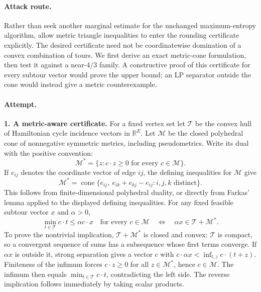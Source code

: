 \documentclass[11pt,a4paper]{article}
\newcommand{\R}{\mathbb{R}}
\numberwithin{equation}{section}
\begin{document}
\paragraph{Attack route.}
Rather than seek another marginal estimate for the unchanged
maximum-entropy algorithm, allow metric triangle inequalities to enter
the rounding certificate explicitly. The desired certificate need not
be coordinatewise domination of a convex combination of tours.
We first derive an exact metric-cone formulation, then test it against
a near-$4/3$ family. A constructive proof of this certificate for every
subtour vector would prove the upper bound; an LP separator outside
the cone would instead give a metric counterexample.

\paragraph{Attempt.}
\textbf{1. A metric-aware certificate.}
For a fixed vertex set let $\mathcal T$ be the convex hull of Hamiltonian
cycle incidence vectors in $\R^E$. Let $\mathcal M$ be the closed
polyhedral cone of nonnegative symmetric metrics, including
pseudometrics. Write its dual with the positive convention:
\[
 \mathcal M^*=\{z:c\cdot z\ge0\text{ for every }c\in\mathcal M\}.
\]
If $e_{ij}$ denotes the coordinate vector of edge $ij$, the defining
inequalities for $\mathcal M$ give
\[
 \mathcal M^*=\operatorname{cone}
 \{e_{ij},\ e_{ik}+e_{kj}-e_{ij}: i,j,k\text{ distinct}\}.
\]
This follows from finite-dimensional polyhedral duality, or directly
from Farkas' lemma applied to the displayed defining inequalities.
For any fixed feasible subtour vector $x$ and $\alpha>0$,
\begin{equation}\label{eq:statement:dual}
 \min_{t\in\mathcal T}c\cdot t\le\alpha c\cdot x
 \quad\text{for every }c\in\mathcal M
 \quad\Longleftrightarrow\quad
               \alpha x\in\mathcal T+\mathcal M^*.
\end{equation}
To prove the nontrivial implication, $\mathcal T+\mathcal M^*$ is
closed and convex: $\mathcal T$ is compact, so a convergent sequence
of sums has a subsequence whose first terms converge. If $\alpha x$
is outside it, strong separation gives a vector $c$ with
$c\cdot\alpha x<\inf_{t,z}c\cdot(t+z)$. Finiteness of the infimum
forces $c\cdot z\ge0$ for all $z\in\mathcal M^*$, hence
$c\in\mathcal M$. The infimum then equals
$\min_{t\in\mathcal T}c\cdot t$, contradicting the left side.
The reverse implication follows immediately by taking scalar products.
\end{document}

